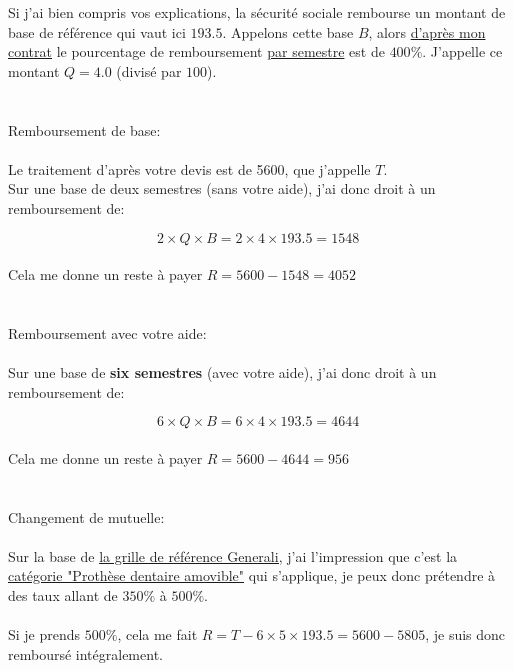 Si j'ai bien compris vos explications, la sécurité sociale rembourse un montant de base de référence qui vaut ici $193.5$\EUR{}. Appelons cette base $B$, alors \textcolor{pkl}{\href{https://imgur.com/a/fOoB4QB}{d'après mon contrat}} le pourcentage de remboursement \underline{par semestre} est de $400\%$. J'appelle ce montant $Q = 4.0$ (divisé par $100$).
\\\\\\
\textcolor{pp}{\large Remboursement de base:}\\\\
Le traitement d'après votre devis est de 5600\EUR{}, que j'appelle $T$.\\
Sur une base de deux semestres (sans votre aide), j'ai donc droit à un remboursement de:

$$2 \times Q\times B = 2 \times 4\times 193.5 = 1548\;$$\\
Cela me donne un reste à payer $R = 5600- 1548 = 4052$\EUR{}
\\\\\\
\textcolor{pp}{\large Remboursement avec votre aide:}\\\\
Sur une base de \textbf{six semestres} (avec votre aide), j'ai donc droit à un remboursement de:

$$6 \times Q\times B = 6 \times 4\times 193.5 = 4644\;$$\\
Cela me donne un reste à payer $R = 5600- 4644 = 956$\EUR{}
\\\\\\
\textcolor{pp}{\large Changement de mutuelle:}\\\\
Sur la base de \textcolor{pkl}{\href{https://www.generali.fr/sites/default/files-d8/2022-04/Tableaugarantiessantesalarie_0.pdf}{la grille de référence Generali,}} j'ai l'impression que c'est la \textcolor{pkl}{\href{https://imgur.com/a/EfqjJm8}{catégorie "Prothèse dentaire amovible"}} qui s'applique, je peux donc prétendre à des taux allant de $350\%$ à $500\%$.
\\\\
Si je prends $500\%$, cela me fait $R = T - 6 \times 5\times 193.5 = 5600 - 5805$, je suis donc remboursé intégralement.
